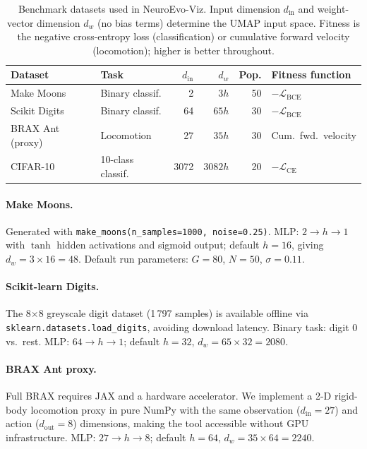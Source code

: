 \documentclass{article}
\begin{document}
\begin{table}[h]
  \caption{Benchmark datasets used in NeuroEvo-Viz. Input dimension $d_{\text{in}}$
  and weight-vector dimension $d_w$ (no bias terms) determine the UMAP input
  space. Fitness is the negative cross-entropy loss (classification) or
  cumulative forward velocity (locomotion); higher is better throughout.}
  \label{tab:datasets}
  \centering
  \begin{tabular}{llrrrl}
    \toprule
    Dataset & Task & $d_{\text{in}}$ & $d_w$ & Pop. & Fitness function \\
    \midrule
    Make Moons        & Binary classif.  & 2    & $3h$            & 50 & $-\mathcal{L}_{\text{BCE}}$ \\
    Scikit Digits     & Binary classif.  & 64   & $65h$           & 30 & $-\mathcal{L}_{\text{BCE}}$ \\
    BRAX Ant (proxy)  & Locomotion       & 27   & $35h$           & 30 & Cum.\ fwd.\ velocity \\
    CIFAR-10          & 10-class classif.& 3072 & $3082h$         & 20 & $-\mathcal{L}_{\text{CE}}$ \\
    \bottomrule
  \end{tabular}
\end{table}

\paragraph{Make Moons.}
Generated with \texttt{make\_moons(n\_samples=1000, noise=0.25)}.
MLP: $2 \to h \to 1$ with $\tanh$ hidden activations and sigmoid output;
default $h=16$, giving $d_w = 3 \times 16 = 48$.
Default run parameters: $G=80$, $N=50$, $\sigma=0.11$.

\paragraph{Scikit-learn Digits.}
The 8$\times$8 greyscale digit dataset (1\,797 samples) is available offline
via \texttt{sklearn.datasets.load\_digits}, avoiding download latency.
Binary task: digit 0 vs.\ rest.
MLP: $64 \to h \to 1$; default $h=32$, $d_w = 65 \times 32 = 2080$.

\paragraph{BRAX Ant proxy.}
Full BRAX \citep{freeman2021brax} requires JAX and a hardware accelerator.
We implement a 2-D rigid-body locomotion proxy in pure NumPy with the same
observation ($d_{\text{in}}=27$) and action ($d_{\text{out}}=8$) dimensions,
making the tool accessible without GPU infrastructure.
MLP: $27 \to h \to 8$; default $h=64$, $d_w = 35 \times 64 = 2240$.
\end{document}
